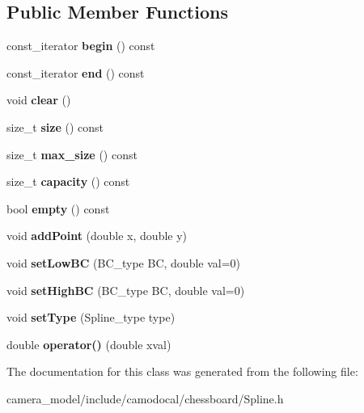 \subsection*{Public Member Functions}
\begin{DoxyCompactItemize}
\item 
\mbox{\label{classSpline_a7ea98a8b01f7b37a234e921ed7e773e4}} 
const\+\_\+iterator {\bfseries begin} () const
\item 
\mbox{\label{classSpline_ac9a6d30fad3fd258372af98f81f8dfe7}} 
const\+\_\+iterator {\bfseries end} () const
\item 
\mbox{\label{classSpline_a02967f3eee8b1755eab0d7da55c3c621}} 
void {\bfseries clear} ()
\item 
\mbox{\label{classSpline_a310f72486a502500fdc73d2e4c0c0448}} 
size\+\_\+t {\bfseries size} () const
\item 
\mbox{\label{classSpline_a11f4aa0a503435c59af3299a76ee8c90}} 
size\+\_\+t {\bfseries max\+\_\+size} () const
\item 
\mbox{\label{classSpline_ad5f2ae88eacebcf2743aa9bf1a9d33c4}} 
size\+\_\+t {\bfseries capacity} () const
\item 
\mbox{\label{classSpline_a277d0cdddeec05a4966a1070babcdc91}} 
bool {\bfseries empty} () const
\item 
\mbox{\label{classSpline_a62f03bd865c88909cb10ef269d179b16}} 
void {\bfseries add\+Point} (double x, double y)
\item 
\mbox{\label{classSpline_a2f8cf1e21489c05a47c1fccf37be1343}} 
void {\bfseries set\+Low\+BC} (B\+C\+\_\+type BC, double val=0)
\item 
\mbox{\label{classSpline_acdfce435ebfa4430a7109660a3380ea7}} 
void {\bfseries set\+High\+BC} (B\+C\+\_\+type BC, double val=0)
\item 
\mbox{\label{classSpline_a519ad69683decf4457b61fcabfcd7990}} 
void {\bfseries set\+Type} (Spline\+\_\+type type)
\item 
\mbox{\label{classSpline_a947f6b5b7fef4bb5e7e692e0a59f893e}} 
double {\bfseries operator()} (double xval)
\end{DoxyCompactItemize}


The documentation for this class was generated from the following file\+:\begin{DoxyCompactItemize}
\item 
camera\+\_\+model/include/camodocal/chessboard/Spline.\+h\end{DoxyCompactItemize}
